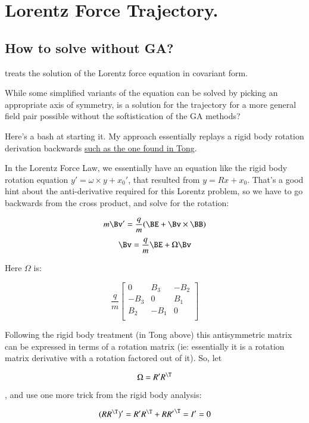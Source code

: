 \chapter{Lorentz Force Trajectory.}
\date{ May 7, 2008.  $RCSfile: lorentzRotation.tex,v $ Last $Revision: 1.8 $ $Date: 2009/06/11 16:45:58 $ }

\section{How to solve without GA? }

\cite{doran2003gap} treats the solution of the Lorentz force equation
in covariant form.

While some simplified variants of the equation can be solved by 
picking an appropriate axis of symmetry, is a solution 
for the trajectory 
for a more general field pair possible without the softistication 
of the GA methods?

Here's a bash at starting it.  My approach essentially replays a
rigid body rotation derivation backwards
\href{http://www.damtp.cam.ac.uk/user/tong/dynamics/three.pdf}{such as the one found in Tong}.

In the Lorentz Force Law, we essentially have an equation like the rigid body rotation equation $y' = \omega \times y + x_0'$, that resulted from $y = R x + x_0$.  That's a good hint about the anti-derivative required for this Lorentz problem, so we have to go backwards from the cross product, and solve for the rotation:
 
\[
m \Bv' = \frac{q}{m} ( \BE + \Bv \times \BB )
\]
\[
\Bv = \frac{q}{m} \BE + \Omega \Bv
\]

Here $\Omega$ is:

\[
\frac{q}{m}
\begin{bmatrix}
0 & B_3 & -B_2 \\
-B_3 & 0 & B_1 \\
B_2 & -B_1 & 0 \\
\end{bmatrix}
\]

Following the rigid body treatment (in Tong above) this antisymmetric matrix can be expressed in terms of a rotation matrix (ie: essentially it is a rotation matrix derivative with a rotation factored out of it).  So, let

\[
\Omega = R' R^\T
\]

, and use one more trick from the rigid body analysis:

\[
(RR^\T)' = R' R^\T + R {R'}^\T = I' = 0
\]

